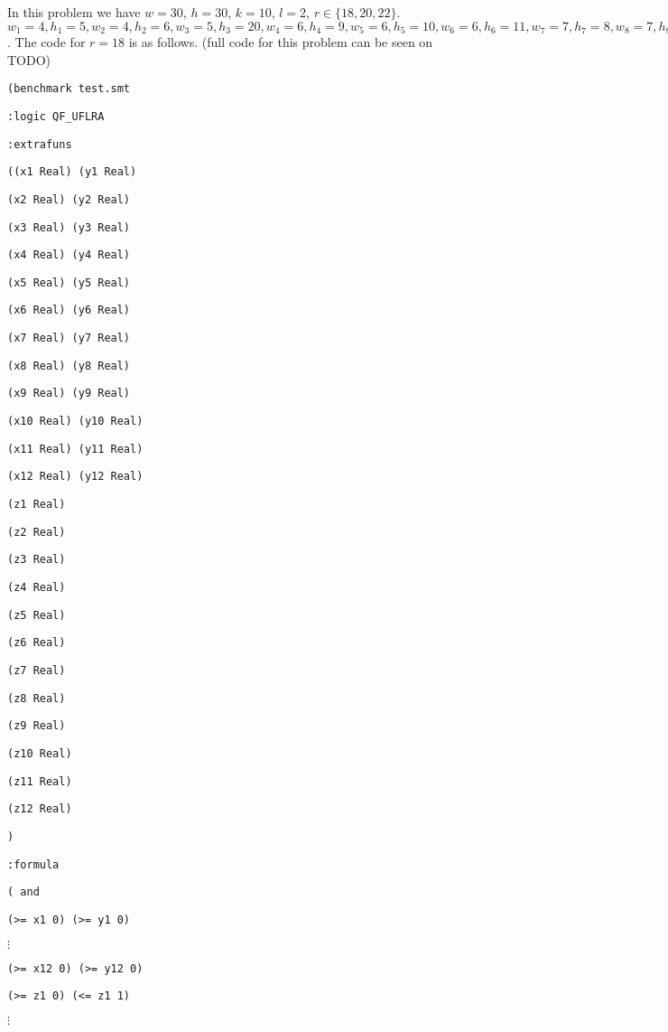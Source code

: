 \documentclass[12pt]{article}
\begin{document}
In this problem we have $w=30$, $h=30$, $k=10$, $l=2$, $r \in \{18, 20, 22\}$.
$w_1 = 4, h_1 = 5, w_2 = 4, h_2 = 6, w_3 = 5, h_3 = 20, w_4 = 6, h_4 = 9, w_5 = 6, h_5 = 10, w_6 = 6, h_6 = 11, w_7 = 7, h_7 = 8, w_8 = 7, h_8 = 12, w_9 = 10, h_10 = 10, w_{10} = 10, h_{10} = 20, w_{11} = 4, h_{11} = 3, w_{12} = 4, h_{12} = 3$. The code for $r=18$ is as follows. (full code for this problem can be seen on TODO)

{\footnotesize
{\tt (benchmark test.smt }

{\tt :logic QF\_UFLRA }

{\tt :extrafuns }

{\tt ((x1 Real) (y1 Real) }

{\tt (x2 Real) (y2 Real) }

{\tt (x3 Real) (y3 Real) }

{\tt (x4 Real) (y4 Real) }

{\tt (x5 Real) (y5 Real) }

{\tt (x6 Real) (y6 Real) }

{\tt (x7 Real) (y7 Real) }

{\tt (x8 Real) (y8 Real) }

{\tt (x9 Real) (y9 Real) }

{\tt (x10 Real) (y10 Real) }

{\tt (x11 Real) (y11 Real) }

{\tt (x12 Real) (y12 Real) }

{\tt (z1 Real) }

{\tt (z2 Real) }

{\tt (z3 Real) }

{\tt (z4 Real) }

{\tt (z5 Real) }

{\tt (z6 Real) }

{\tt (z7 Real) }

{\tt (z8 Real) }

{\tt (z9 Real) }

{\tt (z10 Real) }

{\tt (z11 Real) }

{\tt (z12 Real) }

{\tt ) }

{\tt :formula }

{\tt ( and  }

{\tt (>= x1 0) (>= y1 0)  }

$\vdots$

{\tt (>= x12 0) (>= y12 0) }

{\tt (>= z1 0) (<= z1 1) } 

$\vdots$

}
\end{document}
